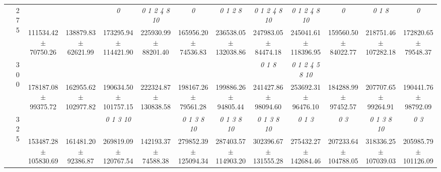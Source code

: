 \begin{table}[h]
{\begin{tabular}{
        ccccccccccccc}
 & \multirow{2}{*}{275}& \cellcolor[HTML]{EFEFEF} & \cellcolor[HTML]{EFEFEF} & \cellcolor[HTML]{EFEFEF} \textit{ 0 }& \cellcolor[HTML]{EFEFEF} \textit{  0  1  2  4  8 10 }& \cellcolor[HTML]{EFEFEF} \textit{ 0 }& \cellcolor[HTML]{EFEFEF} \textit{ 0 1 2 8 }& \cellcolor[HTML]{EFEFEF} \textit{  0  1  2  4  8 10 }& \cellcolor[HTML]{EFEFEF} \textit{  0  1  2  4  8 10 }& \cellcolor[HTML]{EFEFEF} \textit{ 0 }& \cellcolor[HTML]{EFEFEF} \textit{ 0 1 8 }& \cellcolor[HTML]{EFEFEF} \textit{ 0 } \\ 
 & & \cellcolor[HTML]{EFEFEF} 111534.42 $\pm$ 70750.26& \cellcolor[HTML]{EFEFEF} 138879.83 $\pm$ 62621.99& \cellcolor[HTML]{EFEFEF} 173295.94 $\pm$ 114421.90& \cellcolor[HTML]{EFEFEF} 225930.99 $\pm$ 88201.40& \cellcolor[HTML]{EFEFEF} 165956.20 $\pm$ 74536.83& \cellcolor[HTML]{EFEFEF} 236538.05 $\pm$ 132038.86& \cellcolor[HTML]{EFEFEF} 247983.05 $\pm$ 84474.18& \cellcolor[HTML]{EFEFEF} 245041.61 $\pm$ 118396.95& \cellcolor[HTML]{EFEFEF} 159560.50 $\pm$ 84022.77& \cellcolor[HTML]{EFEFEF} 218751.46 $\pm$ 107282.18& \cellcolor[HTML]{EFEFEF} 172820.65 $\pm$ 79548.37 \\ 
 & \multirow{2}{*}{300}& & & & & & & \textit{ 0 1 8 }& \textit{  0  1  2  4  5  8 10 }& & &  \\ 
 & & 178187.08 $\pm$ 99375.72& 162955.62 $\pm$ 102977.82& 190634.50 $\pm$ 101757.15& 222324.87 $\pm$ 130838.58& 198167.26 $\pm$ 79561.28& 199886.26 $\pm$ 94805.44& 241427.86 $\pm$ 98094.60& 253692.31 $\pm$ 96476.10& 184288.99 $\pm$ 97452.57& 207707.65 $\pm$ 99264.91& 190441.76 $\pm$ 98792.09 \\ 
 & \multirow{2}{*}{325}& \cellcolor[HTML]{EFEFEF} & \cellcolor[HTML]{EFEFEF} & \cellcolor[HTML]{EFEFEF} \textit{  0  1  3 10 }& \cellcolor[HTML]{EFEFEF} & \cellcolor[HTML]{EFEFEF} \textit{  0  1  3  8 10 }& \cellcolor[HTML]{EFEFEF} \textit{  0  1  3  8 10 }& \cellcolor[HTML]{EFEFEF} \textit{  0  1  3  8 10 }& \cellcolor[HTML]{EFEFEF} \textit{ 0 1 3 }& \cellcolor[HTML]{EFEFEF} \textit{ 0 3 }& \cellcolor[HTML]{EFEFEF} \textit{  0  1  3  8 10 }& \cellcolor[HTML]{EFEFEF} \textit{ 0 3 } \\ 
 & & \cellcolor[HTML]{EFEFEF} 153487.28 $\pm$ 105830.69& \cellcolor[HTML]{EFEFEF} 161481.20 $\pm$ 92386.87& \cellcolor[HTML]{EFEFEF} 269819.09 $\pm$ 120767.54& \cellcolor[HTML]{EFEFEF} 142193.37 $\pm$ 74588.38& \cellcolor[HTML]{EFEFEF} 279852.39 $\pm$ 125094.34& \cellcolor[HTML]{EFEFEF} 287403.57 $\pm$ 114903.20& \cellcolor[HTML]{EFEFEF} 302396.67 $\pm$ 131555.28& \cellcolor[HTML]{EFEFEF} 275432.27 $\pm$ 142684.46& \cellcolor[HTML]{EFEFEF} 207233.64 $\pm$ 104788.05& \cellcolor[HTML]{EFEFEF} 318336.25 $\pm$ 107039.03& \cellcolor[HTML]{EFEFEF} 205985.79 $\pm$ 101126.09 \\ 

\end{tabular}}
\end{table}

